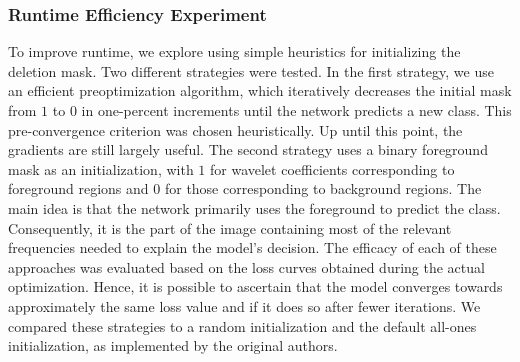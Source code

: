 \subsubsection{Runtime Efficiency Experiment}\label{exp3}
To improve runtime, we explore using simple heuristics for initializing the deletion mask. Two different strategies were tested.
In the first strategy, we use an efficient preoptimization algorithm, which iteratively decreases the initial mask from $1$ to $0$ in one-percent increments until the network predicts a new class.
This pre-convergence criterion was chosen heuristically.
Up until this point, the gradients are still largely useful.
The second strategy uses a binary foreground mask as an initialization, with $1$ for wavelet coefficients corresponding to foreground regions and $0$ for those corresponding to background regions.
The main idea is that the network primarily uses the foreground to predict the class.
Consequently, it is the part of the image containing most of the relevant frequencies needed to explain the model's decision.
The efficacy of each of these approaches was evaluated based on the loss curves obtained during the actual optimization. Hence, it is possible to ascertain that the model converges towards approximately the same loss value and if it does so after fewer iterations.
We compared these strategies to a random initialization and the default all-ones initialization, as implemented by the original authors.


